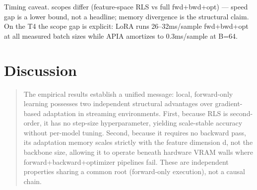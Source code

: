 \documentclass[11pt]{article}
\begin{document}
Timing caveat. scopes differ (feature-space RLS vs full fwd+bwd+opt) --- speed gap is a lower bound, not a headline; memory divergence is the structural claim. On the T4 the scope gap is explicit: LoRA runs 26--32ms/sample fwd+bwd+opt at all measured batch sizes while APIA amortizes to 0.3ms/sample at B=64.

\section{Discussion}\label{discussion}

\begin{quote}
The empirical results establish a unified message: local, forward-only learning possesses two independent structural advantages over gradient-based adaptation in streaming environments. First, because RLS is second-order, it has no step-size hyperparameter, yielding scale-stable accuracy without per-model tuning. Second, because it requires no backward pass, its adaptation memory scales strictly with the feature dimension d, not the backbone size, allowing it to operate beneath hardware VRAM walls where forward+backward+optimizer pipelines fail. These are independent properties sharing a common root (forward-only execution), not a causal chain.


\end{quote}
\end{document}
